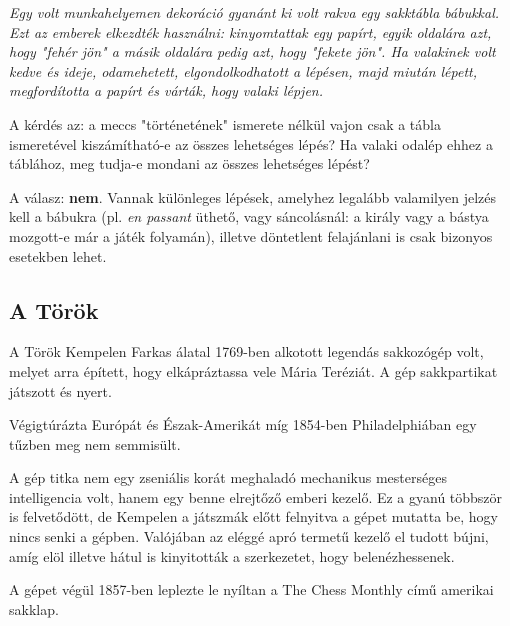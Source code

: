 \documentclass[twoside, a4paper, 12pt]{article}
\begin{document}
\textit{Egy volt munkahelyemen dekoráció gyanánt ki volt rakva egy sakktábla bábukkal. Ezt az emberek elkezdték használni: kinyomtattak egy papírt, egyik oldalára azt, hogy "fehér jön" a másik oldalára pedig azt, hogy "fekete jön". Ha valakinek volt kedve és ideje, odamehetett, elgondolkodhatott a lépésen, majd miután lépett, megfordította a papírt és várták, hogy valaki lépjen.}

A kérdés az: a meccs "történetének" ismerete nélkül vajon csak a tábla ismeretével kiszámítható-e az összes lehetséges lépés? Ha valaki odalép ehhez a táblához, meg tudja-e mondani az összes lehetséges lépést?

A válasz: \textbf{nem}. Vannak különleges lépések, amelyhez legalább valamilyen jelzés kell a bábukra (pl. \textit{en passant} üthető, vagy sáncolásnál: a király vagy a bástya mozgott-e már a játék folyamán), illetve döntetlent felajánlani is csak bizonyos esetekben lehet.

\subsection{A Török}
A Török Kempelen Farkas álatal 1769-ben alkotott legendás sakkozógép volt, melyet arra épített, hogy elkápráztassa vele Mária Teréziát. A gép sakkpartikat játszott és nyert.

Végigtúrázta Európát és Észak-Amerikát míg 1854-ben Philadelphiában egy tűzben meg nem semmisült. 

A gép titka nem egy zseniális korát meghaladó mechanikus mesterséges intelligencia volt, hanem egy benne elrejtőző emberi kezelő. Ez a gyanú többször is felvetődött, de Kempelen a játszmák előtt felnyitva a gépet mutatta be, hogy nincs senki a gépben. Valójában az eléggé apró termetű kezelő el tudott bújni, amíg elöl illetve hátul is kinyitották a szerkezetet, hogy belenézhessenek.

A gépet végül 1857-ben leplezte le nyíltan a The Chess Monthly című amerikai sakklap.\cite{MechanicalTurkHu}\cite{MechanicalTurkEn}
\end{document}
